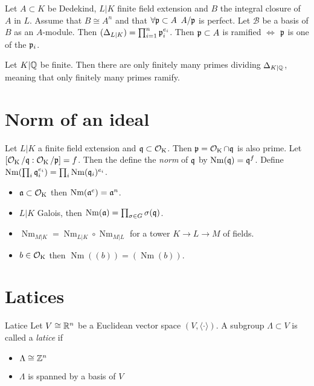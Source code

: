\documentclass[12pt, a4paper]{article}
\newcommand{\BB}{\mathscr{B}}
\DeclareMathOperator{\Nm}{Nm}
\begin{document}
	\begin{thm}
		Let $A \subset K$ be Dedekind, $L \vert K$ finite field extension and 
		$B$ the integral closure of $A$ in $L$. Assume that $B \cong A^n$ 
		and that $\forall \mathfrak{p} \subset A$ $A/\mathfrak{p}$ is perfect. Let 
		$\BB$ be a basis of $B$ as an $A$-module.
		Then $(\Delta_{L \vert K}) = \prod_{i=1}^{n} \mathfrak{p}_i^{e_i}$. Then 
		$\mathfrak{p} \subset A$ is ramified $\iff$ $\mathfrak{p}$ is one of the $\mathfrak{p}_i$.
	\end{thm}

	\begin{cor}{}{}
		Let $K \vert \mathbb{Q}$ be finite. Then there are only finitely many primes
		dividing $\Delta_{K \vert \mathbb{Q}}$, meaning that only finitely many 
		primes ramify.
	\end{cor}

	\section{Norm of an ideal}

	\begin{Def}{}{}
		Let $L \vert K$ a finite field extension and $\mathfrak{q} \subset \operatorname{\mathcal{O}_K}$. 
		Then $\mathfrak{p} = \operatorname{\mathcal{O}_K} \cap \mathfrak{q}$ is also prime. Let $[\operatorname{\mathcal{O}_K}/\mathfrak{q}:\operatorname{\mathcal{O}_K}/\mathfrak{p}] = f$. 
		Then the define the \emph{norm} of $\mathfrak{q}$ by $\Nm(\qq) = \qq^f$.
		Define $\Nm(\prod_{i} \qq_i^{e_i}) = \prod_{i} \Nm(\qq_i)^{e_i}$.
	\end{Def}
	\begin{prop}{}{}
		\begin{itemize}
			\item $\mathfrak{a} \subset \operatorname{\mathcal{O}_K}$ then $\Nm(\aa^e) = \aa^n$.
			\item $L \vert K$ Galois, then $\Nm(\aa) = \prod_{\sigma \in G} \sigma(\qq)$.
			\item $\Nm_{M \vert K} = \Nm_{L \vert K} \circ \Nm_{M \vert L}$ for a 
				tower $K \to L \to M$ of fields.
			\item $b \in \operatorname{\mathcal{O}_K}$ then $\Nm((b)) = (\Nm(b))$.
		\end{itemize}
	\end{prop}

	\section{Latices}	

	\begin{Def}{Latice}{}
		Let $V \cong \mathbb{R}^n$ be a Euclidean vector space $(V, \langle \cdot \rangle)$.
		A subgroup $\Lambda \subset V$ is called a \emph{latice} if 
		\begin{itemize}
			\item $\Lambda \cong \mathbb{Z}^n$
			\item $\Lambda$ is spanned by a basis of $V$
		\end{itemize}
	\end{Def}
\end{document}
